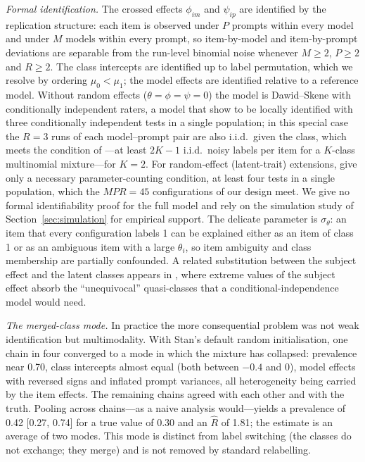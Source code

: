 \emph{Formal identification.} The crossed effects $\phi_{im}$ and $\psi_{ip}$ are identified by the replication structure: each item is observed under $P$ prompts within every model and under $M$ models within every prompt, so item-by-model and item-by-prompt deviations are separable from the run-level binomial noise whenever $M \ge 2$, $P \ge 2$ and $R \ge 2$. The class intercepts are identified up to label permutation, which we resolve by ordering $\mu_0 < \mu_1$; the model effects are identified relative to a reference model. Without random effects ($\theta = \phi = \psi = 0$) the model is Dawid--Skene with conditionally independent raters, a model that \citet{Jones2009} show to be locally identified with three conditionally independent tests in a single population; in this special case the $R = 3$ runs of each model--prompt pair are also i.i.d.\ given the class, which meets the condition of \citet{Nguyen2023}---at least $2K - 1$ i.i.d.\ noisy labels per item for a $K$-class multinomial mixture---for $K = 2$. For random-effect (latent-trait) extensions, \citet{Jones2009} give only a necessary parameter-counting condition, at least four tests in a single population, which the $MPR = 45$ configurations of our design meet. We give no formal identifiability proof for the full model and rely on the simulation study of Section~\ref{sec:simulation} for empirical support. The delicate parameter is $\sigma_\theta$: an item that every configuration labels 1 can be explained either as an item of class 1 or as an ambiguous item with a large $\theta_i$, so item ambiguity and class membership are partially confounded. A related substitution between the subject effect and the latent classes appears in \citet{Qu1996}, where extreme values of the subject effect absorb the ``unequivocal'' quasi-classes that a conditional-independence model would need.

\emph{The merged-class mode.} In practice the more consequential problem was not weak identification but multimodality. With Stan's default random initialisation, one chain in four converged to a mode in which the mixture has collapsed: prevalence near 0.70, class intercepts almost equal (both between $-0.4$ and 0), model effects with reversed signs and inflated prompt variances, all heterogeneity being carried by the item effects. The remaining chains agreed with each other and with the truth. Pooling across chains---as a naive analysis would---yields a prevalence of 0.42 [0.27, 0.74] for a true value of 0.30 and an $\widehat{R}$ of 1.81; the estimate is an average of two modes. This mode is distinct from label switching (the classes do not exchange; they merge) and is not removed by standard relabelling.

